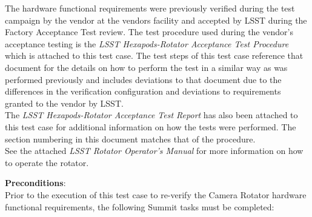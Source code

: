 \documentclass[SE,lsstdraft,STR,toc]{lsstdoc}
\begin{document}
The hardware functional requirements were previously verified during the
test campaign by the vendor at the vendors facility and accepted by LSST
during the Factory Acceptance Test review. The test procedure used
during the vendor's acceptance testing is the \emph{LSST
Hexapods-Rotator Acceptance Test Procedure} which is attached to this
test case. The test steps of this test case reference that document for
the details on how to perform the test in a similar way as was performed
previously and includes deviations to that document due to the
differences in the verification configuration and deviations to
requirements granted to the vendor by LSST.\\[2\baselineskip]The
\emph{LSST Hexapods-Rotator Acceptance Test Report} has also been
attached to this test case for additional information on how the tests
were performed. The section numbering in this document matches that of
the procedure.\\[2\baselineskip]See the attached \emph{LSST Rotator
Operator's Manual} for more information on how to operate the rotator.


\textbf{ Preconditions}:\\
{Prior to the execution of this test case to re-verify the Camera
Rotator hardware functional requirements, the following Summit tasks
must be completed:}
\end{document}
